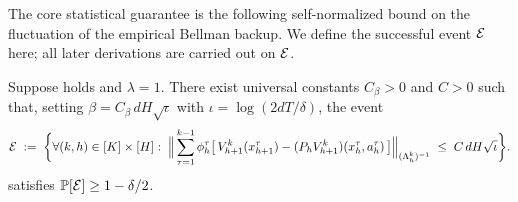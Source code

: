 The core statistical guarantee is the following self-normalized bound on the
fluctuation of the empirical Bellman backup. We define the successful event
$\mathcal{E}$ here; all later derivations are carried out on $\mathcal{E}$.

\begin{lemma}\label{lem:concentration}
Suppose  holds and $\lambda=1$. There exist universal
constants $C_\beta>0$ and $C>0$ such that, setting
$\beta=C_\beta\,dH\sqrt{\iota}$ with $\iota=\log(2dT/\delta)$, the event
\begin{align}\label{eq:event-def}
\mathcal{E} \;:=\; \bigg\{
\forall (k,h)\in[K]\times[H]:\;
\Big\| \sum_{\tau=1}^{k-1} \phi_h^\tau \big[\, V_{h+1}^k(x_{h+1}^\tau) - (P_h V_{h+1}^k)(x_h^\tau,a_h^\tau) \,\big] \Big\|_{(\Lambda_h^k)^{-1}}
\;\le\; C\, dH\sqrt{\iota}
\bigg\}.
\end{align}
satisfies $\mathbb{P}[\mathcal{E}]\ge 1-\delta/2$.
\end{lemma}

